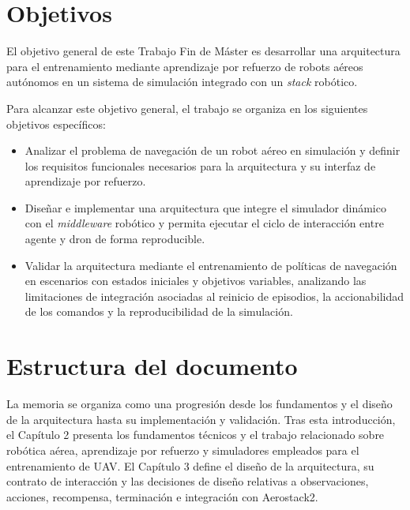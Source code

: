 
\section{Objetivos} \label{sct:intro:objetivos}

El objetivo general de este Trabajo Fin de Máster es desarrollar una arquitectura
para el entrenamiento mediante aprendizaje por refuerzo de robots aéreos
autónomos en un sistema de simulación integrado con un \emph{stack} robótico.

Para alcanzar este objetivo general, el trabajo se organiza en los siguientes
objetivos específicos:

\begin{itemize}

    \item Analizar el problema de navegación de un robot aéreo en simulación y
    definir los requisitos funcionales necesarios para la arquitectura y su
    interfaz de aprendizaje por refuerzo.

    \item Diseñar e implementar una arquitectura que integre el
    simulador dinámico con el \emph{middleware} robótico y permita ejecutar el
    ciclo de interacción entre agente y dron de forma reproducible.

    \item Validar la arquitectura mediante el entrenamiento de políticas de
    navegación en escenarios con estados iniciales y objetivos variables,
    analizando las limitaciones de integración asociadas al reinicio de
    episodios, la accionabilidad de los comandos y la reproducibilidad de la
    simulación.

\end{itemize}


\section{Estructura del documento} \label{sct:intro_estructura}

La memoria se organiza como una progresión desde los fundamentos y el diseño de la arquitectura
hasta su implementación y validación. Tras esta introducción, el
Capítulo 2 presenta los fundamentos técnicos y el trabajo relacionado sobre
robótica aérea, aprendizaje por refuerzo y simuladores empleados para el
entrenamiento de UAV. El Capítulo 3 define el diseño de la arquitectura, su
contrato de interacción y las decisiones de diseño relativas a observaciones,
acciones, recompensa, terminación e integración con Aerostack2.

